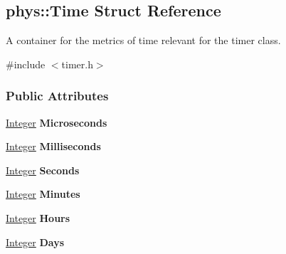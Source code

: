 \hypertarget{structphys_1_1Time}{
\subsection{phys::Time Struct Reference}
\label{structphys_1_1Time}
}


A container for the metrics of time relevant for the timer class.  




{\ttfamily \#include $<$timer.h$>$}

\subsubsection*{Public Attributes}
\begin{DoxyCompactItemize}
\item 
\hypertarget{structphys_1_1Time_ad0e070fdec0d826d73dc01f5ee4dddc7}{
\hyperlink{namespacephys_a7f09bf5585b2bb97613cd9aad4273a81}{Integer} {\bfseries Microseconds}}
\label{structphys_1_1Time_ad0e070fdec0d826d73dc01f5ee4dddc7}

\item 
\hypertarget{structphys_1_1Time_afeb0b8025b7cea824a84523565d7dd60}{
\hyperlink{namespacephys_a7f09bf5585b2bb97613cd9aad4273a81}{Integer} {\bfseries Milliseconds}}
\label{structphys_1_1Time_afeb0b8025b7cea824a84523565d7dd60}

\item 
\hypertarget{structphys_1_1Time_aa526d7de0d2fde457dc458d7ee6285d1}{
\hyperlink{namespacephys_a7f09bf5585b2bb97613cd9aad4273a81}{Integer} {\bfseries Seconds}}
\label{structphys_1_1Time_aa526d7de0d2fde457dc458d7ee6285d1}

\item 
\hypertarget{structphys_1_1Time_a142f48583baee67495ea65acf76cbdd5}{
\hyperlink{namespacephys_a7f09bf5585b2bb97613cd9aad4273a81}{Integer} {\bfseries Minutes}}
\label{structphys_1_1Time_a142f48583baee67495ea65acf76cbdd5}

\item 
\hypertarget{structphys_1_1Time_aceeebc7a8950d38fb9c9bcf483a5a751}{
\hyperlink{namespacephys_a7f09bf5585b2bb97613cd9aad4273a81}{Integer} {\bfseries Hours}}
\label{structphys_1_1Time_aceeebc7a8950d38fb9c9bcf483a5a751}

\item 
\hypertarget{structphys_1_1Time_aab43bd475fab9342887b0762281e80a4}{
\hyperlink{namespacephys_a7f09bf5585b2bb97613cd9aad4273a81}{Integer} {\bfseries Days}}
\label{structphys_1_1Time_aab43bd475fab9342887b0762281e80a4}

\end{DoxyCompactItemize}



